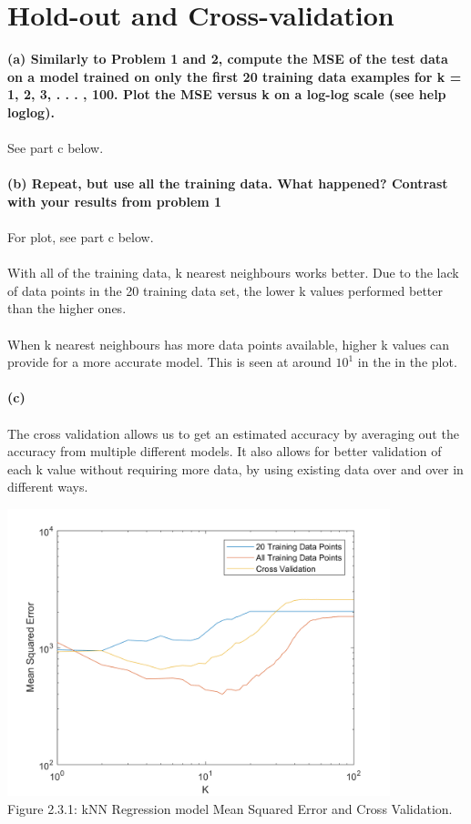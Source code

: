 \documentclass[]{report}   %
\begin{document}
\section{Hold-out and Cross-validation}
{\bf (a) Similarly to Problem 1 and 2, compute the MSE of the test data on a model trained on only the first 20 training data examples for k = 1, 2, 3, . . . , 100. Plot the MSE versus k on a log-log scale (see help loglog).}
\\~\\
See part c below.
\\~\\
{\bf (b) Repeat, but use all the training data. What happened? Contrast with your results from problem 1}
\\~\\
For plot, see part c below.
\\~\\
With all of the training data, k nearest neighbours works better. Due to the lack of data points in the 20 training data set, the lower k values performed better than the higher ones. 
\\~\\
When k nearest neighbours has more data points available, higher k values can provide for a more accurate model. This is seen at around $10^1$ in the in the plot.
\\~\\
{\bf (c) }
\\~\\
The cross validation allows us to get an estimated accuracy by averaging out the accuracy from multiple different models. It also allows for better validation of each k value without requiring more data, by using existing data over and over in different ways.
\begin{center}
	\includegraphics[width=30em,keepaspectratio]{2_3_Figure_1.png}\\
	{Figure 2.3.1: kNN Regression model Mean Squared Error and Cross Validation.}
\end{center} 
\end{document}
